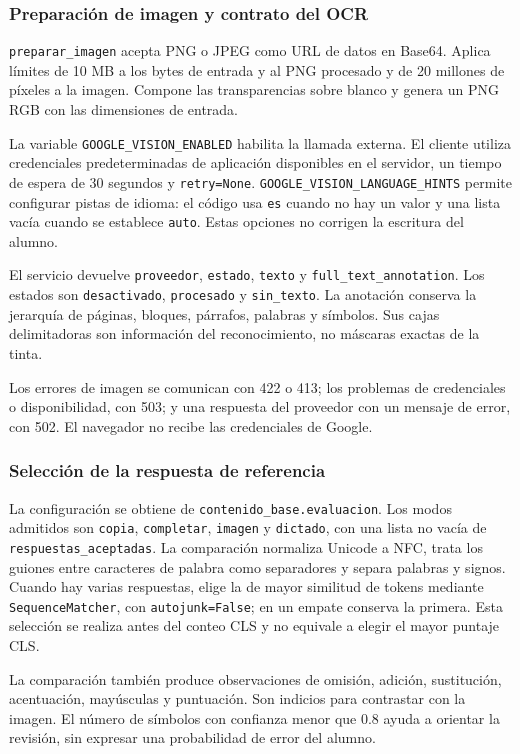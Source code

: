 \subsubsection{Preparación de imagen y contrato del OCR}
\texttt{preparar\_imagen} acepta PNG o JPEG como URL de datos en Base64. Aplica límites de 10 MB a los bytes de entrada y al PNG procesado y de 20 millones de píxeles a la imagen. Compone las transparencias sobre blanco y genera un PNG RGB con las dimensiones de entrada.

La variable \texttt{GOOGLE\_VISION\_ENABLED} habilita la llamada externa. El cliente utiliza credenciales predeterminadas de aplicación disponibles en el servidor, un tiempo de espera de 30 segundos y \texttt{retry=None}. \texttt{GOOGLE\_VISION\_LANGUAGE\_HINTS} permite configurar pistas de idioma: el código usa \texttt{es} cuando no hay un valor y una lista vacía cuando se establece \texttt{auto}. Estas opciones no corrigen la escritura del alumno.

El servicio devuelve \texttt{proveedor}, \texttt{estado}, \texttt{texto} y \texttt{full\_text\_annotation}. Los estados son \texttt{desactivado}, \texttt{procesado} y \texttt{sin\_texto}. La anotación conserva la jerarquía de páginas, bloques, párrafos, palabras y símbolos. Sus cajas delimitadoras son información del reconocimiento, no máscaras exactas de la tinta.

Los errores de imagen se comunican con 422 o 413; los problemas de credenciales o disponibilidad, con 503; y una respuesta del proveedor con un mensaje de error, con 502. El navegador no recibe las credenciales de Google.

\subsubsection{Selección de la respuesta de referencia}
La configuración se obtiene de \texttt{contenido\_base.evaluacion}. Los modos admitidos son \texttt{copia}, \texttt{completar}, \texttt{imagen} y \texttt{dictado}, con una lista no vacía de \texttt{respuestas\_aceptadas}. La comparación normaliza Unicode a NFC, trata los guiones entre caracteres de palabra como separadores y separa palabras y signos. Cuando hay varias respuestas, elige la de mayor similitud de tokens mediante \texttt{SequenceMatcher}, con \texttt{autojunk=False}; en un empate conserva la primera. Esta selección se realiza antes del conteo CLS y no equivale a elegir el mayor puntaje CLS.

La comparación también produce observaciones de omisión, adición, sustitución, acentuación, mayúsculas y puntuación. Son indicios para contrastar con la imagen. El número de símbolos con confianza menor que 0.8 ayuda a orientar la revisión, sin expresar una probabilidad de error del alumno.

